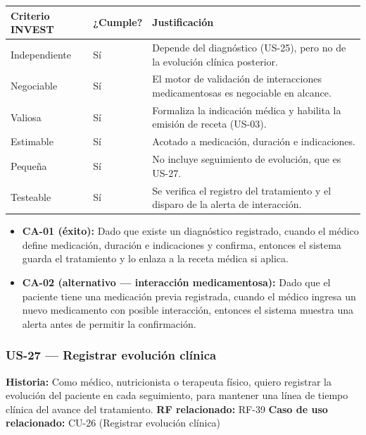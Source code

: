 \documentclass[11pt,a4paper]{article}
\providecommand{\tightlist}{%
	\setlength{\itemsep}{0pt}\setlength{\parskip}{0pt}}
\begin{document}
	\begin{longtable}{p{} p{} p{}}
		\toprule
		\textbf{Criterio INVEST} & \textbf{¿Cumple?} & \textbf{Justificación} \\
		\midrule
		\endhead
		Independiente & Sí & Depende del diagnóstico (US-25), pero no de la evolución clínica posterior. \\
		Negociable & Sí & El motor de validación de interacciones medicamentosas es negociable en alcance. \\
		Valiosa & Sí & Formaliza la indicación médica y habilita la emisión de receta (US-03). \\
		Estimable & Sí & Acotado a medicación, duración e indicaciones. \\
		Pequeña & Sí & No incluye seguimiento de evolución, que es US-27. \\
		Testeable & Sí & Se verifica el registro del tratamiento y el disparo de la alerta de interacción. \\
		\bottomrule
	\end{longtable}
	
	\begin{itemize}
		\tightlist
		\item \textbf{CA-01 (éxito):} Dado que existe un diagnóstico registrado, cuando el médico define medicación, duración e indicaciones y confirma, entonces el sistema guarda el tratamiento y lo enlaza a la receta médica si aplica.
		\item \textbf{CA-02 (alternativo --- interacción medicamentosa):} Dado que el paciente tiene una medicación previa registrada, cuando el médico ingresa un nuevo medicamento con posible interacción, entonces el sistema muestra una alerta antes de permitir la confirmación.
	\end{itemize}
	
	\subsubsection{US-27 --- Registrar evolución clínica}
	
	\textbf{Historia:} Como médico, nutricionista o terapeuta físico, quiero registrar la evolución del paciente en cada seguimiento, para mantener una línea de tiempo clínica del avance del tratamiento.
	\textbf{RF relacionado:} RF-39
	\textbf{Caso de uso relacionado:} CU-26 (Registrar evolución clínica)
	
\end{document}

